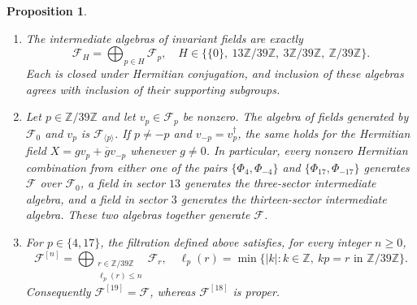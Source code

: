 \documentclass[leqno]{article}
\newcommand{\Z}{\ensuremath{\mathbb{Z}}}
\renewcommand{\leq}{\ensuremath{\leqslant}}
\renewcommand{\geq}{\ensuremath{\geqslant}}
\newtheorem{prop}[thm]{Proposition}
\numberwithin{equation}{section}
\begin{document}
\begin{prop}
\label{prop:four-invariant-intermediate-algebras}
\begin{enumerate}
\item The intermediate algebras of invariant fields are exactly
\begin{equation}
\label{eq:four-invariant-intermediate-algebras}
\mathscr F_H = \bigoplus_{p \in H}\mathscr F_p,
\quad
H \in \bigl\{\{0\},\ 13\Z/39\Z,\ 3\Z/39\Z,\ \Z/39\Z\bigr\}.
\end{equation}
Each is closed under Hermitian conjugation, and inclusion of these algebras agrees with inclusion of their supporting subgroups.
\item Let $p \in \Z/39\Z$ and let $v_p \in \mathscr F_p$ be nonzero. The algebra of fields generated by $\mathscr F_0$ and $v_p$ is $\mathscr F_{\langle p\rangle}$. If $p \neq -p$ and $v_{-p} = v_p^\dagger$, the same holds for the Hermitian field $X = gv_p+\overline gv_{-p}$ whenever $g \neq 0$. In particular, every nonzero Hermitian combination from either one of the pairs $\{\Phi_4,\Phi_{-4}\}$ and $\{\Phi_{17},\Phi_{-17}\}$ generates $\mathscr F$ over $\mathscr F_0$, a field in sector $13$ generates the three-sector intermediate algebra, and a field in sector $3$ generates the thirteen-sector intermediate algebra. These two algebras together generate $\mathscr F$.
\item For $p \in \{4,17\}$, the filtration defined above satisfies, for every integer $n \geq 0$,
\begin{equation}
\label{eq:weak-generation-filtration}
\mathscr F^{[n]} = \bigoplus_{\substack{r \in \Z/39\Z\\ \ell_p(r) \leq n}}\mathscr F_r,
\quad
\ell_p(r) = \min\{|k|:k \in \Z,\ kp = r \text{ in }\Z/39\Z\}.
\end{equation}
Consequently $\mathscr F^{[19]} = \mathscr F$, whereas $\mathscr F^{[18]}$ is proper.
\end{enumerate}
\end{prop}
\end{document}
